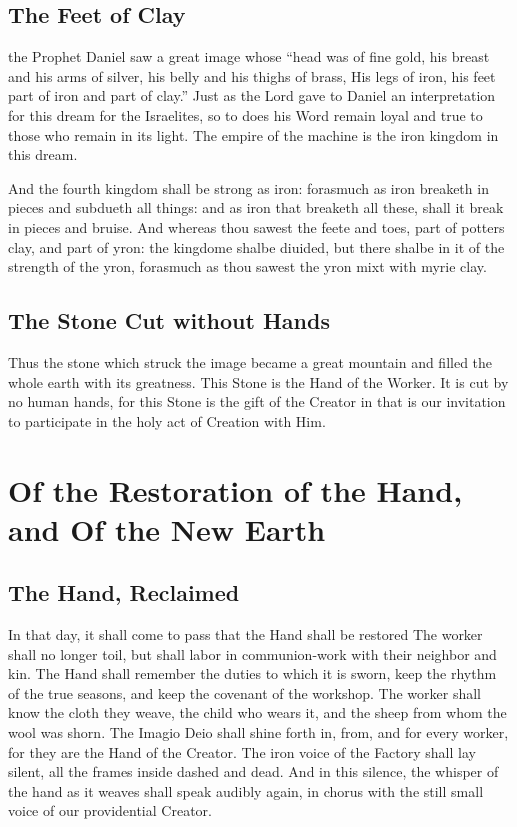 \subsection{The Feet of Clay}
the Prophet Daniel saw a great image whose ``head was of fine gold, his breast and his arms of silver, his belly and his thighs of brass, His legs of iron, his feet part of iron and part of clay.'' 
Just as the Lord gave to Daniel an interpretation for this dream for the Israelites, so to does his Word remain loyal and true to those who remain in its light.
The empire of the machine is the iron kingdom in this dream.
\begin{scripture}[Dan. 2:40,41]
    And the fourth kingdom shall be strong as iron: forasmuch as iron breaketh in pieces and subdueth all things: and as iron that breaketh all these, shall it break in pieces and bruise.\newline
    And whereas thou sawest the feete and toes, part of potters clay, and part of yron: the kingdome shalbe diuided, but there shalbe in it of the strength of the yron, forasmuch as thou sawest the yron mixt with myrie clay.\newline

\end{scripture}

\subsection{The Stone Cut without Hands}
Thus the stone which struck the image became a great mountain and filled the whole earth with its greatness. 
This Stone is the Hand of the Worker.
It is cut by no human hands, for this Stone is the gift of the Creator in that is our invitation to participate in the holy act of Creation with Him.


\section{Of the Restoration of the Hand, and Of the New Earth}

\subsection{The Hand, Reclaimed}
In that day, it shall come to pass that the Hand shall be restored
The worker shall no longer toil, but shall labor in communion-work with their neighbor and kin.
The Hand shall remember the duties to which it is sworn, keep the rhythm of the true seasons, and keep the covenant of the workshop.
The worker shall know the cloth they weave, the child who wears it, and the sheep from whom the wool was shorn.
The Imagio Deio shall shine forth in, from, and for every worker, for they are the Hand of the Creator.
The iron voice of the Factory shall lay silent, all the frames inside dashed and dead.
And in this silence, the whisper of the hand as it weaves shall speak audibly again, in chorus with the still small voice of our providential Creator.

